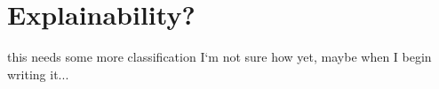 



\section{Explainability?}\label{sec:rl<REPLACE THIS>}
this needs some more classification I`m not sure how yet, maybe when I begin writing it...




